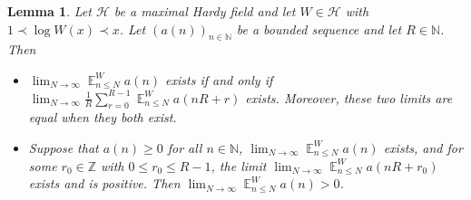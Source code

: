 \documentclass[12pt]{article}
\theoremstyle{plain} %
\newtheorem{lemma}[theorem]{Lemma}
\theoremstyle{definition} %
\theoremstyle{plain}
\theoremstyle{plain}
\numberwithin{equation}{section}
\newcommand{\N}{\mathbb{N}}
\newcommand{\Z}{\mathbb{Z}}
\renewcommand{\leq}{\leqslant}
\renewcommand{\geq}{\geqslant}
\newcommand{\1}{\mathbbm{1}}
\newcommand{\E}{\operatorname{\mathbb{E}}}
\newcommand{\oo}{\infty}
\begin{document}
\begin{lemma}\label{lem:variant_of_modulo_averages}
    Let $\mathcal{H}$ be a maximal 
    Hardy field and let $W\in \mathcal{H}$ with $1\prec \log W(x)\prec x$. Let $(a(n))_{n\in \N}$ be a bounded sequence and let $R\in \N$. Then
    \begin{itemize}
        \item $\lim_{N\to\oo}\E_{n\leq N}^Wa(n)$ exists if and only if $\lim_{N\to\oo}\frac{1}{R}\sum_{r=0}^{R-1}\E_{n\leq N}^Wa(nR+r)$ exists. Moreover, these two limits are equal when they both exist.
        \item Suppose that $a(n)\geq 0$ for all $n\in \N$, $\lim_{N\to\oo}\E_{n\leq N}^Wa(n)$ exists, and for some $r_0\in \Z$ with $0\leq r_0\leq R-1$, the limit $\lim_{N\to\oo}\E_{n\leq N}^Wa(nR+r_0)$ exists and is positive. Then $\lim_{N\to\oo}\E_{n\leq N}^Wa(n)>0$.
    \end{itemize}
\end{lemma}
\end{document}
